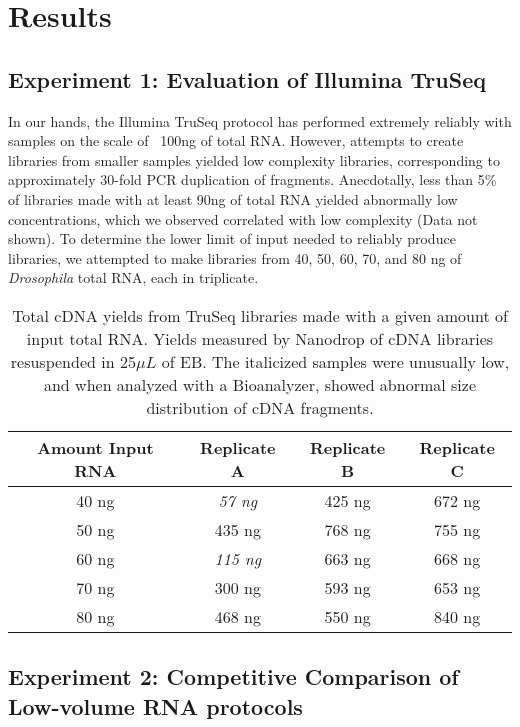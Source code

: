 \section{Results}


\subsection{Experiment 1: Evaluation of Illumina TruSeq}

In our hands, the Illumina TruSeq protocol has performed extremely reliably with samples on the scale of ~100ng of total RNA.  However, attempts to create libraries from smaller samples yielded low complexity libraries, corresponding to approximately 30-fold PCR duplication of fragments. Anecdotally, less than 5\% of libraries made with at least 90ng of total RNA yielded abnormally low concentrations, which we observed correlated with low complexity (Data not shown). To determine the lower limit of input needed to reliably produce libraries, we attempted to make libraries from 40, 50, 60, 70, and 80 ng of {\em Drosophila} total RNA, each in triplicate.

\begin{table}[htdp]
\caption{Total cDNA yields from TruSeq libraries made with a given amount of input total RNA.  Yields measured by Nanodrop of cDNA libraries resuspended in 25$\mu L$ of EB. The italicized samples were unusually low, and when analyzed with a Bioanalyzer, showed abnormal size distribution of cDNA fragments.}
\begin{center}
\begin{tabular}{|c|c|c|c|}\hline
Amount Input RNA & Replicate A & Replicate B & Replicate C\\\hline
40 ng & {\em  57 ng}  & 425 ng & 672 ng\\
50 ng & 435 ng & 768 ng & 755 ng\\
60 ng & {\em 115 ng} & 663 ng & 668 ng\\
70 ng & 300 ng & 593 ng & 653 ng\\
80 ng & 468 ng & 550 ng & 840 ng\\\hline
\end{tabular}
\end{center}
\label{table:truseqtitration}
\end{table}



\subsection{Experiment 2: Competitive Comparison of Low-volume RNA protocols}

